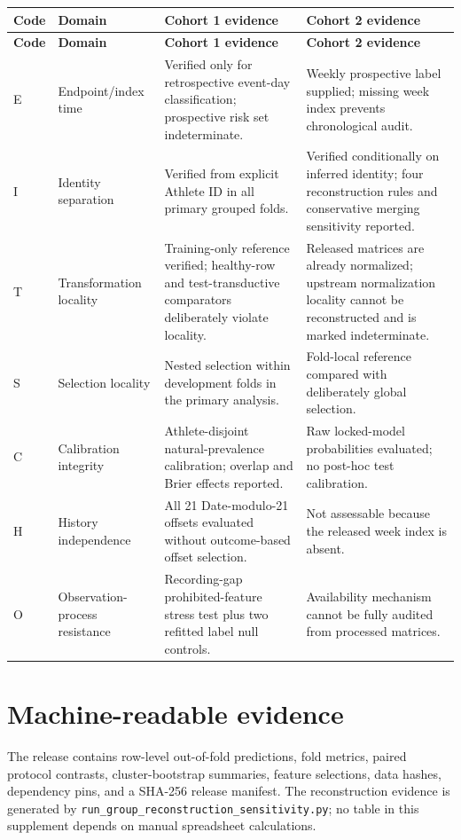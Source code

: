 \documentclass[11pt,a4paper]{article}
\begin{document}
\begin{longtable}{L{1.1cm} L{3.1cm} L{5.2cm} L{5.2cm}}
\toprule
\textbf{Code} & \textbf{Domain} & \textbf{Cohort 1 evidence} & \textbf{Cohort 2 evidence} \\
\midrule
\endfirsthead
\toprule
\textbf{Code} & \textbf{Domain} & \textbf{Cohort 1 evidence} & \textbf{Cohort 2 evidence} \\
\midrule
\endhead
E & Endpoint/index time & Verified only for retrospective event-day classification; prospective risk set indeterminate. & Weekly prospective label supplied; missing week index prevents chronological audit. \\
I & Identity separation & Verified from explicit Athlete ID in all primary grouped folds. & Verified conditionally on inferred identity; four reconstruction rules and conservative merging sensitivity reported. \\
T & Transformation locality & Training-only reference verified; healthy-row and test-transductive comparators deliberately violate locality. & Released matrices are already normalized; upstream normalization locality cannot be reconstructed and is marked indeterminate. \\
S & Selection locality & Nested selection within development folds in the primary analysis. & Fold-local reference compared with deliberately global selection. \\
C & Calibration integrity & Athlete-disjoint natural-prevalence calibration; overlap and Brier effects reported. & Raw locked-model probabilities evaluated; no post-hoc test calibration. \\
H & History independence & All 21 Date-modulo-21 offsets evaluated without outcome-based offset selection. & Not assessable because the released week index is absent. \\
O & Observation-process resistance & Recording-gap prohibited-feature stress test plus two refitted label null controls. & Availability mechanism cannot be fully audited from processed matrices. \\
\bottomrule
\end{longtable}

\section{Machine-readable evidence}

The release contains row-level out-of-fold predictions, fold metrics, paired
protocol contrasts, cluster-bootstrap summaries, feature selections, data
hashes, dependency pins, and a SHA-256 release manifest. The reconstruction
evidence is generated by
\texttt{run\_group\_reconstruction\_sensitivity.py}; no table in this
supplement depends on manual spreadsheet calculations.
\end{document}

